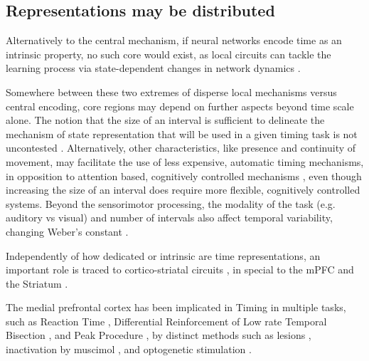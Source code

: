         \subsection{Representations may be distributed}
        Alternatively to the central mechanism, if neural networks encode time as an intrinsic property, no such core would exist, as local circuits can tackle the learning process via state-dependent changes in network dynamics \cite{mauk2004neural, paton2018neural, buonomano1995temporal, motanis2018short}. 
        
        Somewhere between these two extremes of disperse local mechanisms versus central encoding, core regions may depend on further aspects beyond time scale alone. The notion that the size of an interval is sufficient to delineate the mechanism of state representation that will be used in a given timing task is not uncontested \cite{van20168}. Alternatively, other characteristics, like presence and continuity of movement, may facilitate the use of less expensive, automatic timing mechanisms, in opposition to attention based, cognitively controlled mechanisms \cite{lewis2003distinct}, even though increasing the size of an interval does require more flexible, cognitively controlled systems. Beyond the sensorimotor processing, the modality of the task (e.g. auditory vs visual) and number of intervals also affect temporal variability, changing Weber's constant \cite{merchant2008we}.
    
        Independently of how dedicated or intrinsic are time representations, an important role is traced to cortico-striatal circuits \cite{lusk2016utilizing, buhusi2005makes, meck2008cortico}, in special to the mPFC \cite{buhusi2018inactivation} and the Striatum \cite{mello2015scalable}.
        
        The medial prefrontal cortex has been implicated in Timing in multiple tasks, such as Reaction Time \cite{narayanan2009delay}, Differential Reinforcement of Low rate \cite{cho2010differential} Temporal Bisection \cite{kim2009inactivation,tiganj2016sequential,kim2013neural}, and Peak Procedure \cite{buhusi2018inactivation}, by distinct methods such as lesions \cite{cho2010differential}, inactivation by muscimol \cite{buhusi2018inactivation, kim2009inactivation}, and optogenetic stimulation \cite{kim2017optogenetic}.
        
